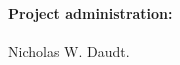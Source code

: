 \documentclass[10pt,letterpaper]{article}
\begin{document}
\paragraph*{Project administration:} Nicholas W. Daudt.

\nolinenumbers

%
%

%
%
%
%


\end{document}
